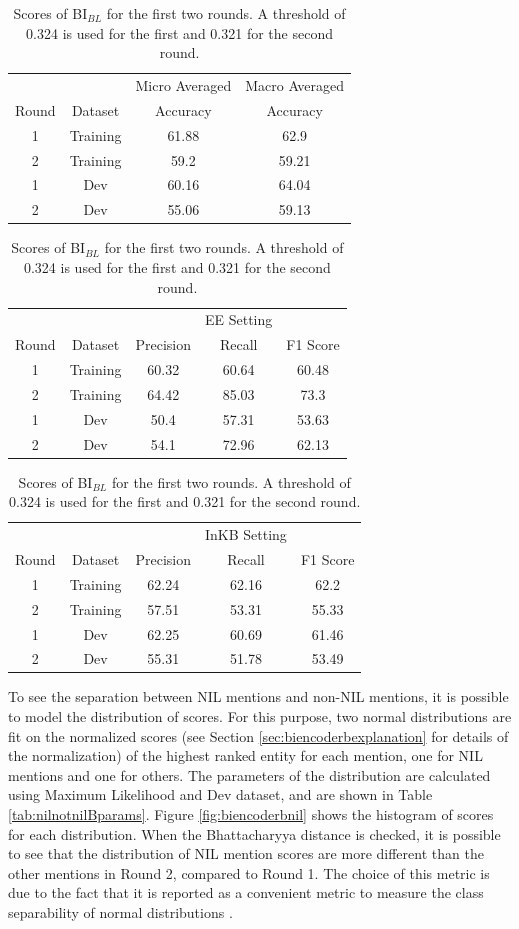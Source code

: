 \documentclass{report}
\theoremstyle{definition}
\theoremstyle{remark}
\begin{document}
\begin{table}
    \centering
    \begin{tabular}{cccc}
    &&Micro Averaged & Macro Averaged\\
    Round    & Dataset & Accuracy &Accuracy \\
    \hline
    1  & Training & 61.88&62.9\\
    2  & Training & 59.2&	59.21\\
    1  & Dev & 60.16	&64.04\\
    2  & Dev & 55.06	&59.13\\
    \end{tabular}
    
    \vspace{0.5cm}\begin{tabular}{ccccc}
    &&&EE Setting & \\
    Round    & Dataset & Precision & Recall & F1 Score \\
    \hline
    1  & Training &60.32&	60.64&	60.48 \\
    2  & Training &64.42&	85.03&	73.3 \\
    1  & Dev &50.4&	57.31&	53.63 \\
    2  & Dev &54.1&	72.96&	62.13\\
    \end{tabular}
    
    \vspace{0.5cm}\begin{tabular}{ccccc}
    &&&InKB Setting & \\
    Round    & Dataset & Precision & Recall & F1 Score \\
    \hline
    1  & Training &62.24&62.16	&62.2\\
    2  & Training &57.51&53.31	&55.33\\
    1  & Dev &62.25&60.69	&61.46 \\
    2  & Dev &55.31&51.78	&53.49\\
    \end{tabular}
    
    \caption{Scores of BI$_{BL}$ for the first two rounds. A threshold of 0.324 is used for the first and 0.321 for the second round.}
    \label{tab:biencoderbres}
\end{table}

To see the separation between NIL mentions and non-NIL mentions, it is possible to model the distribution of scores. For this purpose, two normal distributions are fit on the normalized scores (see Section \ref{sec:biencoderbexplanation} for details of the normalization) of the highest ranked entity for each mention, one for NIL mentions and one for others. The parameters of the distribution are calculated using Maximum Likelihood and Dev dataset, and are shown in Table \ref{tab:nilnotnilBparams}. Figure \ref{fig:biencoderbnil} shows the histogram of scores for each distribution. When the Bhattacharyya distance \cite{bhatt} is checked, it is possible to see that the distribution of NIL mention scores are more different than the other mentions in Round 2, compared to Round 1. The choice of this metric is due to the fact that it is reported as a convenient metric to measure the class separability of normal distributions \cite{bhatt}.
\end{document}
